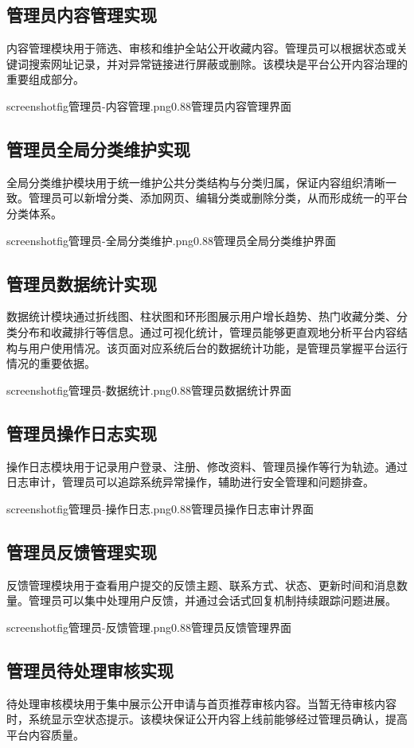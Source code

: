 \documentclass[12pt,a4paper]{ctexart}
\begin{document}
\subsection{管理员内容管理实现}
内容管理模块用于筛选、审核和维护全站公开收藏内容。管理员可以根据状态或关键词搜索网址记录，并对异常链接进行屏蔽或删除。该模块是平台公开内容治理的重要组成部分。

screenshotfig{管理员-内容管理.png}{0.88}{管理员内容管理界面}

\subsection{管理员全局分类维护实现}
全局分类维护模块用于统一维护公共分类结构与分类归属，保证内容组织清晰一致。管理员可以新增分类、添加网页、编辑分类或删除分类，从而形成统一的平台分类体系。

screenshotfig{管理员-全局分类维护.png}{0.88}{管理员全局分类维护界面}

\subsection{管理员数据统计实现}
数据统计模块通过折线图、柱状图和环形图展示用户增长趋势、热门收藏分类、分类分布和收藏排行等信息。通过可视化统计，管理员能够更直观地分析平台内容结构与用户使用情况。该页面对应系统后台的数据统计功能，是管理员掌握平台运行情况的重要依据。

screenshotfig{管理员-数据统计.png}{0.88}{管理员数据统计界面}


\subsection{管理员操作日志实现}
操作日志模块用于记录用户登录、注册、修改资料、管理员操作等行为轨迹。通过日志审计，管理员可以追踪系统异常操作，辅助进行安全管理和问题排查。

screenshotfig{管理员-操作日志.png}{0.88}{管理员操作日志审计界面}

\subsection{管理员反馈管理实现}
反馈管理模块用于查看用户提交的反馈主题、联系方式、状态、更新时间和消息数量。管理员可以集中处理用户反馈，并通过会话式回复机制持续跟踪问题进展。

screenshotfig{管理员-反馈管理.png}{0.88}{管理员反馈管理界面}

\subsection{管理员待处理审核实现}
待处理审核模块用于集中展示公开申请与首页推荐审核内容。当暂无待审核内容时，系统显示空状态提示。该模块保证公开内容上线前能够经过管理员确认，提高平台内容质量。
\end{document}
